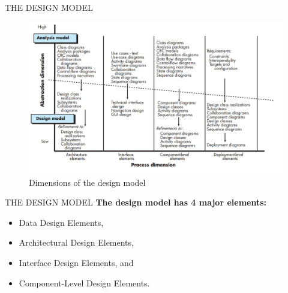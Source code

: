 \documentclass{beamer}
\begin{document}
\begin{frame}{THE DESIGN MODEL}
		\begin{figure}
		\includegraphics[scale=.4]{img/m2_35.jpg}
		\caption{Dimensions of the design model }
	\end{figure}
\end{frame}
\begin{frame}{THE DESIGN MODEL}
	\textbf{The design model has 4 major elements:}
\begin{itemize}
	\item 	Data Design Elements,
	\item Architectural Design Elements,
	\item Interface Design Elements, and
	\item Component-Level Design Elements.
\end{itemize}
\end{frame}
\end{document}
